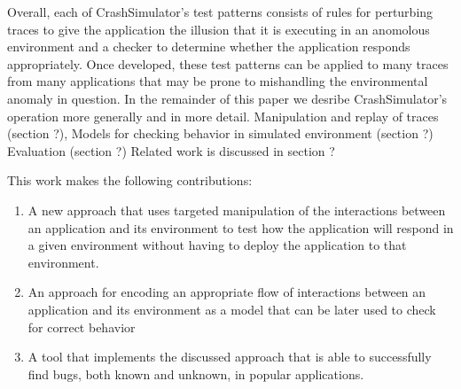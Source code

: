 Overall, each of CrashSimulator's test patterns consists of rules for perturbing traces to give the application the illusion that it is executing in an anomolous environment and a checker to determine whether the application responds appropriately. Once developed, these test patterns can be applied to many traces from many applications that may be prone to mishandling the environmental anomaly in question.
In the remainder of this paper we desribe CrashSimulator's operation more generally and in more detail.
Manipulation and replay of traces (section ?),
Models for checking behavior in simulated environment (section ?)
Evaluation (section ?)
Related work is discussed in section ?

		This work makes the following contributions:

    \begin{enumerate}
        \item{A new approach that uses targeted manipulation of the interactions between an application and its
            environment to test how the application will respond in a given environment without having to deploy
            the application to that environment.}
        \item{An approach for encoding an appropriate flow of interactions between an application and its environment as
            a model that can be later used to check for correct behavior}
        \item{A tool that implements the discussed approach that is able to successfully find bugs, both known and
            unknown, in popular applications.}
    \end{enumerate}



